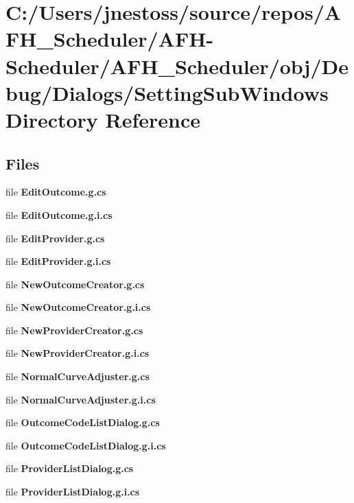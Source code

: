 \section{C\+:/\+Users/jnestoss/source/repos/\+A\+F\+H\+\_\+\+Scheduler/\+A\+F\+H-\/\+Scheduler/\+A\+F\+H\+\_\+\+Scheduler/obj/\+Debug/\+Dialogs/\+Setting\+Sub\+Windows Directory Reference}
\label{dir_a950e456b6c25ff58719757378c48e87}
\subsection*{Files}
\begin{DoxyCompactItemize}
\item 
file \textbf{ Edit\+Outcome.\+g.\+cs}
\item 
file \textbf{ Edit\+Outcome.\+g.\+i.\+cs}
\item 
file \textbf{ Edit\+Provider.\+g.\+cs}
\item 
file \textbf{ Edit\+Provider.\+g.\+i.\+cs}
\item 
file \textbf{ New\+Outcome\+Creator.\+g.\+cs}
\item 
file \textbf{ New\+Outcome\+Creator.\+g.\+i.\+cs}
\item 
file \textbf{ New\+Provider\+Creator.\+g.\+cs}
\item 
file \textbf{ New\+Provider\+Creator.\+g.\+i.\+cs}
\item 
file \textbf{ Normal\+Curve\+Adjuster.\+g.\+cs}
\item 
file \textbf{ Normal\+Curve\+Adjuster.\+g.\+i.\+cs}
\item 
file \textbf{ Outcome\+Code\+List\+Dialog.\+g.\+cs}
\item 
file \textbf{ Outcome\+Code\+List\+Dialog.\+g.\+i.\+cs}
\item 
file \textbf{ Provider\+List\+Dialog.\+g.\+cs}
\item 
file \textbf{ Provider\+List\+Dialog.\+g.\+i.\+cs}
\end{DoxyCompactItemize}
